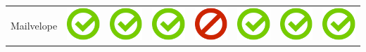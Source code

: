 \documentclass[10pt,foldmark,tumble]{leaflet}
\begin{document}
{{\begin{tabular}{ L{2cm} | C{2cm} | C{2cm} | C{2cm} | C{2cm} | C{2cm} | C{2cm} | C{2cm} | }
Mailvelope   & \includegraphics[scale=0.1]{pics/haken.png} & \includegraphics[scale=0.1]{pics/haken.png} & \includegraphics[scale=0.1]{pics/haken.png} & \includegraphics[scale=0.1]{pics/nohaken.png} & \includegraphics[scale=0.1]{pics/haken.png} & \includegraphics[scale=0.1]{pics/haken.png} & \includegraphics[scale=0.1]{pics/haken.png} \tabularnewline

\end{tabular}}}
\end{document}
